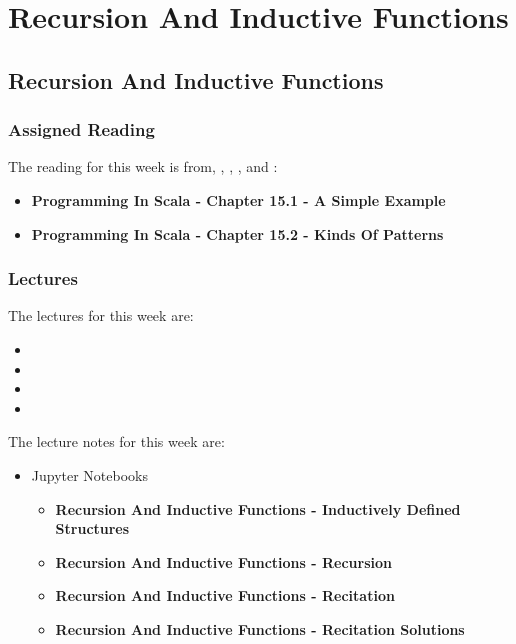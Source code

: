 \clearpage

\renewcommand{\ChapTitle}{Recursion And Inductive Functions}
\renewcommand{\SectionTitle}{Recursion And Inductive Functions}

\chapter{\ChapTitle}

\section{\SectionTitle}

\subsection{Assigned Reading}

The reading for this week is from, \AtomicScalaBook, \EssOfPPLBook, \FuncOfPPLBook, and \ProgInScalaBook:

\begin{itemize}
    \item \textbf{Programming In Scala - Chapter 15.1 - A Simple Example}
    \item \textbf{Programming In Scala - Chapter 15.2 - Kinds Of Patterns}
\end{itemize}

\subsection{Lectures}

The lectures for this week are:

\begin{itemize}
    \item {}
    \item {}
    \item {}
    \item {}
\end{itemize}

\noindent The lecture notes for this week are:

\begin{itemize}
    \item Jupyter Notebooks
    \begin{itemize}
        \item \textbf{Recursion And Inductive Functions - Inductively Defined Structures}
        \item \textbf{Recursion And Inductive Functions - Recursion}
        \item \textbf{Recursion And Inductive Functions - Recitation}
        \item \textbf{Recursion And Inductive Functions - Recitation Solutions}
    \end{itemize}
\end{itemize}


